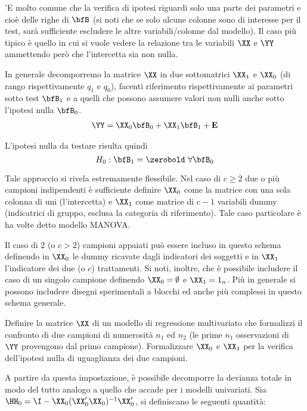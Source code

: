 \documentclass[]{article}
\begin{document}
'E molto comune che la verifica di ipotesi riguardi solo una parte dei
parametri e cioè delle righe di \(\bfB\) (si noti che se solo alcune
colonne sono di interesse per il test, sarà sufficiente escludere le
altre variabili/colonne dal modello). Il caso più tipico è quello in cui
si vuole vedere la relazione tra le variabili \(\XX\) e \(\YY\)
ammettendo però che l'intercetta sia non nulla.

In generale decomporremo la matrice \(\XX\) in due sottomatrici
\(\XX_1\) e \(\XX_0\) (di rango rispettivamente \(q_1\) e \(q_0\)),
facenti riferimento rispettivamente ai parametri sotto test \(\bfB_1\) e
a quelli che possono assumere valori non nulli anche sotto l'ipotesi
nulla \(\bfB_0\). \begin{eqnarray}\label{full}
\mathbf{\YY} = \XX_0\bfB_0 +  \XX_1\bfB_1 + \mathbf{E}
\end{eqnarray}

L'ipotesi nulla da testare risulta quindi
\[H_0: \bfB_1=\zerobold \ \forall \bfB_0\]

\bigskip

Tale approccio si rivela estremamente flessibile. Nel caso di
\(c\geq 2\) due o più campioni indipendenti è sufficiente definire
\(\XX_0\) come la matrice con una sola colonna di uni (l'intercetta) e
\(\XX_1\) come matrice di \(c-1\) variabili dummy (indicatrici di
gruppo, esclusa la categoria di riferimento). Tale caso particolare è ha
volte detto modello MANOVA.

Il caso di 2 (o \(c>2\)) campioni appaiati può essere incluso in questo
schema definendo in \(\XX_0\) le dummy ricavate dagli indicatori dei
soggetti e in \(\XX_1\) l'indicatore dei due (o \(c\)) trattamenti. Si
noti, inoltre, che è possibile includere il caso di un singolo campione
definendo \(\XX_0=\emptyset\) e \(\XX_1=1_n\). Più in generale si
possono includere disegni sperimentali a blocchi ed anche più complessi
in questo schema generale.

\begin{ExerciseList}
\Exercise Definire la matrice $\XX$ di un modello di regressione multivariato che formalizzi il confronto di due campioni di numerosità $n_1$ ed $n_2$ (le prime $n_1$ osservazioni di $\YY$ provengono dal primo campione).
\Exercise Formalizzare $\XX_0$ e $\XX_1$ per la verifica dell'ipotesi nulla di uguaglianza dei due campioni.
\end{ExerciseList}
\bigskip

A partire da questa impostazione, è possibile decomporre la devianza
totale in modo del tutto analogo a quello che accade per i modelli
univariati. Sia \(\HH_0=\I - \XX_0(\XX_0'\XX_0)^{-1}\XX_0'\), si
definiscano le seguenti quantità:
\end{document}
